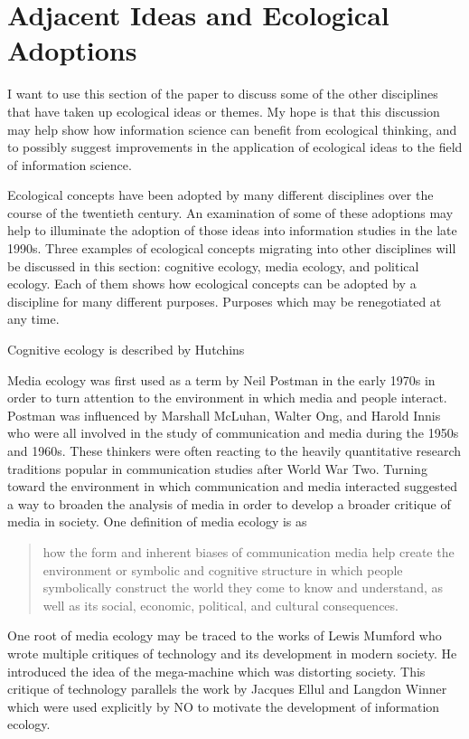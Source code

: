 \section{Adjacent Ideas and Ecological Adoptions}

I want to use this section of the paper to discuss some of the other disciplines that have taken up ecological ideas or themes. My hope is that this discussion may help show how information science can benefit from ecological thinking, and to possibly suggest improvements in the application of ecological ideas to the field of information science.

Ecological concepts have been adopted by many different disciplines over the course of the twentieth century. An examination of some of these adoptions may help to illuminate the adoption of those ideas into information studies in the late 1990s. Three examples of ecological concepts migrating into other disciplines will be discussed in this section: cognitive ecology, media ecology, and political ecology. Each of them shows how ecological concepts can be adopted by a discipline for many different purposes. Purposes which may be renegotiated at any time.

Cognitive ecology is described by Hutchins \cite{hutchins_cognitive_2010}

Media ecology was first used as a term by Neil Postman in the early 1970s in order to turn attention to the environment in which media and people interact. Postman was influenced by Marshall McLuhan, Walter Ong, and Harold Innis who were all involved in the study of communication and media during the 1950s and 1960s. These thinkers were often reacting to the heavily quantitative research traditions popular in communication studies after World War Two. Turning toward the environment in which communication and media interacted suggested a way to broaden the analysis of media in order to develop a broader critique of media in society. One definition of media ecology is as

\begin{quote}
how the form and inherent biases of communication media help create the environment or symbolic and cognitive structure in which people symbolically construct the world they come to know and understand, as well as its social, economic, political, and cultural consequences. \cite{lum_introduction:_2000}
\end{quote}

One root of media ecology may be traced to the works of Lewis Mumford who wrote multiple critiques of technology and its development in modern society. He introduced the idea of the mega-machine which was distorting society. This critique of technology parallels the work by Jacques Ellul and Langdon Winner which were used explicitly by NO to motivate the development of information ecology.